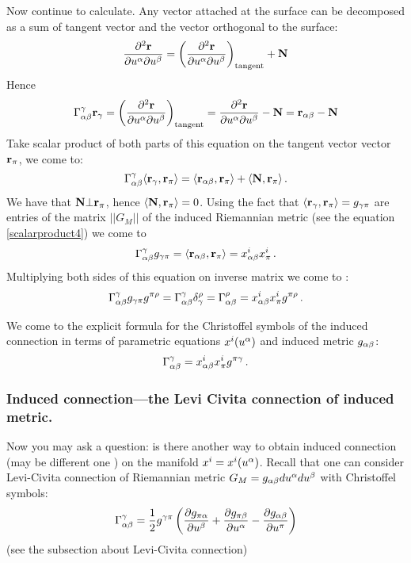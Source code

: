\documentclass[12pt]{article}
\theoremstyle{theorem}
\numberwithin{equation}{section}
\begin{document}
Now continue to calculate. Any vector attached at the surface can be decomposed as a sum of tangent vector and the vector orthogonal to the surface:
               $$
           {\partial^2{\bf r} \over \partial u^\alpha\partial u^\beta}=\left({\partial^2{\bf r} \over \partial u^\alpha\partial u^\beta}\right)_{\rm tangent}+{\bf N}
               $$
 Hence
 \begin{equation}\label{christoffelsymbols1forinducedconnection4}
 \Gamma^\gamma_{\alpha\beta}{\bf r}_\gamma=\left({\partial^2{\bf r} \over \partial u^\alpha\partial u^\beta}\right)_{\rm tangent}=
 {\partial^2{\bf r} \over \partial u^\alpha\partial u^\beta}-{\bf N}= {\bf r}_{\alpha\beta}-{\bf N}
\end{equation}
Take scalar product of  both parts of this equation on the tangent vector vector ${\bf r}_\pi$, we come to:
            $$
         \Gamma^\gamma_{\alpha\beta}\langle{\bf r}_\gamma, {\bf r}_\pi\rangle=
         \langle{\bf r}_{\alpha\beta},{\bf r}_\pi\rangle+\langle{\bf N},{\bf r}_\pi\rangle\,.
            $$
We have that ${\bf N}\bot {\bf r}_\pi$, hence $\langle{\bf N},{\bf r}_\pi\rangle=0$. Using the fact that
$\langle{\bf r}_\gamma, {\bf r}_\pi\rangle=g_{\gamma\pi}$ are entries of the matrix $||G_M||$ of the induced Riemannian metric
(see the equation \eqref{scalarproduct4}) we come to
               $$
\Gamma^\gamma_{\alpha\beta}g_{\gamma\pi}=\langle{\bf r}_{\alpha\beta},{\bf r}_\pi\rangle=x^i_{\alpha\beta}x^i_\pi\,.
               $$
Multiplying both sides of this equation on inverse matrix we come to :
               $$
\Gamma^\gamma_{\alpha\beta}g_{\gamma\pi}g^{\pi\rho}=\Gamma^\gamma_{\alpha\beta}\delta_\gamma^\rho=
\Gamma^\rho_{\alpha\beta}=x^i_{\alpha\beta}x^i_\pi g^{\pi\rho}\,.
               $$

We come to the explicit formula for the Christoffel symbols of the induced connection in terms of
parametric equations $x^i(u^\alpha)$ and induced metric $g_{\alpha\beta}$:
\begin{equation}\label{connectionintermsofinducedmetric}
\Gamma^\gamma_{\alpha\beta}=x^i_{\alpha\beta}x^i_\pi g^{\pi\gamma}\,.
\end{equation}

\subsubsection{Induced connection---the Levi Civita connection of induced metric.}

 Now you may ask a question: is there another  way to obtain induced connection (may be different one )
 on the manifold  $x^i=x^i(u^\alpha)$. Recall that one can consider Levi-Civita connection of
 Riemannian metric $G_M=g_{\alpha\beta}du^\alpha du^\beta$ with Christoffel symbols:
                   \begin{equation}\label{levi-civita12}
      \Gamma^\gamma_{\alpha\beta}={1\over 2}g^{\gamma\pi}
      \left({\partial g_{\pi \alpha}\over \partial u^\beta}+{\partial g_{\pi \beta}\over \partial u^\alpha}-
      {\partial g_{\alpha\beta}\over \partial u^\pi}\right)
                   \end{equation}
 (see the subsection about Levi-Civita connection)
\end{document}
